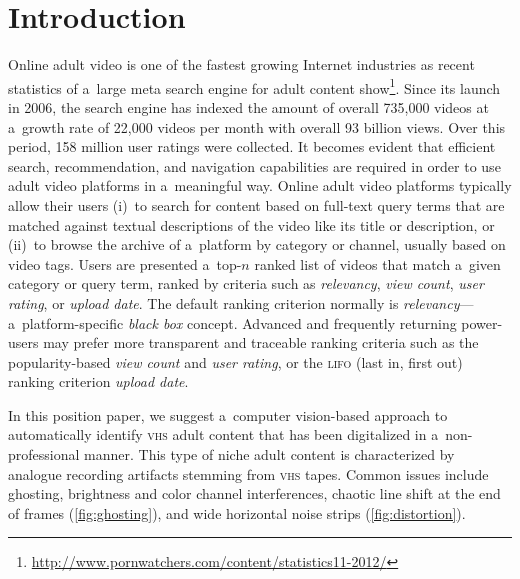\documentclass{sig-alternate}
\begin{document}


\section{Introduction}

Online adult video is one of the fastest growing Internet industries
as recent statistics of a~large meta search engine for adult content
show\footnote{\url{http://www.pornwatchers.com/content/statistics11-2012/}}.
Since its launch in 2006, the search engine has indexed
the amount of overall 735,000 videos at a~growth rate of 22,000 videos per month
with overall 93 billion views.
Over this period, 158 million user ratings were collected.
It becomes evident that efficient search, recommendation, and
navigation capabilities are required in order to use
adult video platforms in a~meaningful way.
Online adult video platforms typically allow their users
(i)~to search for content based on full-text query terms
that are matched against textual descriptions
of the video like its title or description,
or (ii)~to browse the archive of a~platform by category or channel,
usually based on video tags.
Users are presented a~top-$n$ ranked list of videos
that match a~given category
or query term, ranked by criteria such as
\emph{relevancy}, \emph{view count},
\emph{user rating}, or \emph{upload date}.
The default ranking criterion normally is
\emph{relevancy}---a~platform-specific \emph{black box} concept.
Advanced and frequently returning power-users
may prefer more transparent and traceable ranking criteria
such as the popularity-based \emph{view count}
and \emph{user rating}, or the 
{\scshape lifo} (last in, first out) ranking criterion \emph{upload date}.

In this position paper, we suggest a~computer vision-based
approach to automatically identify {\scshape vhs} adult content
that has been digitalized in a~non-professional manner.
This type of niche adult content is characterized by
analogue recording artifacts stemming from {\scshape vhs} tapes.
Common issues include
ghosting, brightness and color channel interferences,
chaotic line shift at the end of frames (\autoref{fig:ghosting}),
and wide horizontal noise strips (\autoref{fig:distortion}).
\end{document}
